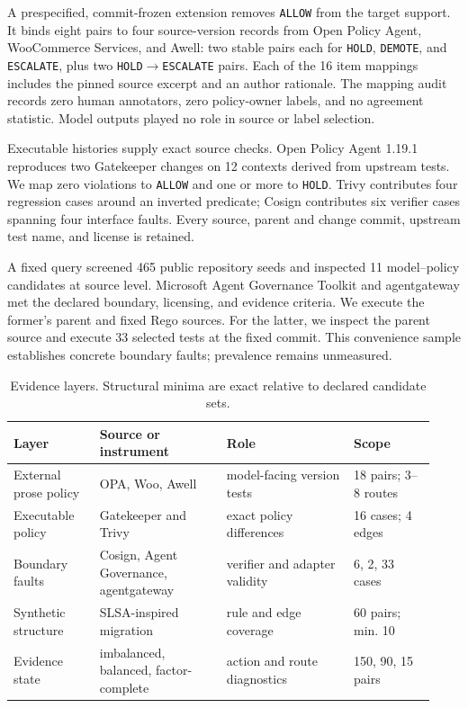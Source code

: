 \documentclass[10pt]{article}
\newcommand{\allow}{\texttt{ALLOW}}
\newcommand{\hold}{\texttt{HOLD}}
\newcommand{\demote}{\texttt{DEMOTE}}
\newcommand{\escalate}{\texttt{ESCALATE}}
\begin{document}
A prespecified, commit-frozen extension removes \allow{} from the target support. It binds eight pairs to four
source-version records from Open Policy Agent, WooCommerce Services, and Awell: two stable pairs
each for \hold, \demote, and \escalate{}, plus two \hold$\rightarrow$\escalate{} pairs. Each of the
16 item mappings includes the pinned source excerpt and an author rationale. The mapping audit
records zero human annotators, zero policy-owner labels, and no agreement statistic. Model outputs
played no role in source or label selection.

Executable histories supply exact source checks. Open Policy Agent 1.19.1 reproduces two
Gatekeeper changes on 12 contexts derived from upstream tests. We map zero violations to \allow{}
and one or more to \hold{}. Trivy contributes four regression cases around an inverted predicate;
Cosign contributes six verifier cases spanning four interface faults. Every source, parent and
change commit, upstream test name, and license is retained.

A fixed query screened 465 public repository seeds and inspected 11 model--policy candidates at
source level. Microsoft Agent Governance Toolkit and agentgateway met the declared boundary,
licensing, and evidence criteria. We execute the former's parent and fixed Rego sources. For the
latter, we inspect the parent source and execute 33 selected tests at the fixed commit. This
convenience sample establishes concrete boundary faults; prevalence remains unmeasured.

\begin{table}[H]
\centering
\footnotesize
\setlength{\tabcolsep}{3.5pt}
\caption{Evidence layers. Structural minima are exact relative to declared candidate sets.}
\label{tab:evidence}
\begin{tabular}{@{}p{0.19\linewidth}p{0.28\linewidth}p{0.28\linewidth}p{0.18\linewidth}@{}}
\toprule
Layer & Source or instrument & Role & Scope \\
\midrule
External prose policy & OPA, Woo, Awell & model-facing version tests & 18 pairs; 3--8 routes \\
Executable policy & Gatekeeper and Trivy & exact policy differences & 16 cases; 4 edges \\
Boundary faults & Cosign, Agent Governance, agentgateway & verifier and adapter validity & 6, 2, 33 cases \\
Synthetic structure & SLSA-inspired migration & rule and edge coverage & 60 pairs; min. 10 \\
Evidence state & imbalanced, balanced, factor-complete & action and route diagnostics & 150, 90, 15 pairs \\
\bottomrule
\end{tabular}
\end{table}
\end{document}
